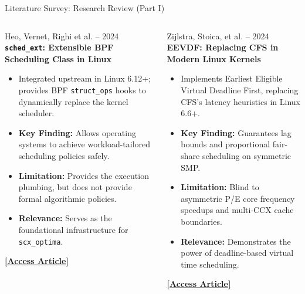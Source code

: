\documentclass{beamer}
\begin{document}
\begin{frame}{Literature Survey: Research Review (Part I)}
  \footnotesize
  \begin{columns}[T]
      \begin{block}{\color{white}Heo, Vernet, Righi et al. -- 2024}
        \textbf{\texttt{sched\_ext}: Extensible BPF Scheduling Class in Linux}
        \begin{itemize}\scriptsize\itemsep2pt
          \item Integrated upstream in Linux 6.12+; provides BPF \texttt{struct\_ops} hooks to dynamically replace the kernel scheduler.
          \item \textbf{Key Finding:} Allows operating systems to achieve workload-tailored scheduling policies safely.
          \item \textbf{Limitation:} Provides the execution plumbing, but does not provide formal algorithmic policies.
          \item \textbf{Relevance:} Serves as the foundational infrastructure for \texttt{scx\_optima}.
        \end{itemize}
        \href{https://lwn.net/Articles/922258/}{\textcolor{primary}{\textbf{[Access Article]}}}
      \end{block}

      \begin{block}{\color{white}Zijlstra, Stoica, et al. -- 2024}
        \textbf{EEVDF: Replacing CFS in Modern Linux Kernels}
        \begin{itemize}\scriptsize\itemsep2pt
          \item Implements Earliest Eligible Virtual Deadline First, replacing CFS's latency heuristics in Linux 6.6+.
          \item \textbf{Key Finding:} Guarantees lag bounds and proportional fair-share scheduling on symmetric SMP.
          \item \textbf{Limitation:} Blind to asymmetric P/E core frequency speedups and multi-CCX cache boundaries.
          \item \textbf{Relevance:} Demonstrates the power of deadline-based virtual time scheduling.
        \end{itemize}
        \href{https://lwn.net/Articles/925371/}{\textcolor{primary}{\textbf{[Access Article]}}}
      \end{block}
  \end{columns}
\end{frame}
\end{document}
